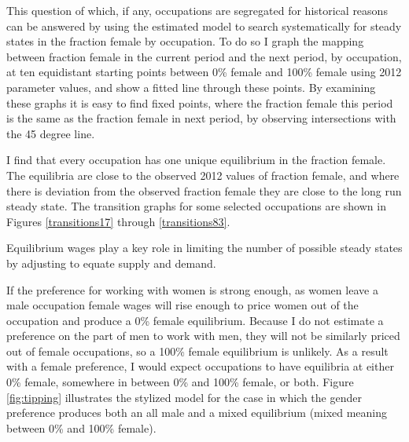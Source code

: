 \documentclass[12pt]{article}
\begin{document}

This question of which, if any, occupations are segregated for historical reasons can be answered by using the estimated model to search systematically for steady states in the fraction female by occupation. To do so I graph the mapping between fraction female in the current period and the next period, by occupation, at ten equidistant starting points between 0\% female and 100\% female using 2012 parameter values, and show a fitted line through these points. By examining these graphs it is easy to find fixed points, where the fraction female this period is the same as the fraction female in next period, by observing intersections with the 45 degree line. 




I find that every occupation has one unique equilibrium in the fraction female. The equilibria are close to the observed 2012 values of fraction female, and where there is deviation from the observed fraction female they are close to the long run steady state. The transition graphs for some selected occupations are shown in Figures \ref{transitions17} through \ref{transitions83}.




Equilibrium wages play a key role in limiting the number of possible steady states by adjusting to equate supply and demand.

If the preference for working with women is strong enough, as women leave a male occupation female wages will rise enough to price women out of the occupation and produce a 0\% female equilibrium. Because I do not estimate a preference on the part of men to work with men, they will not be similarly priced out of female occupations, so a 100\% female equilibrium is unlikely. As a result with a female preference, I would expect occupations to have equilibria at either 0\% female, somewhere in between 0\% and 100\% female, or both. Figure \ref{fig:tipping} illustrates the stylized model for the case in which the gender preference produces both an all male and a mixed equilibrium (mixed meaning between 0\% and 100\% female). 
\end{document}
